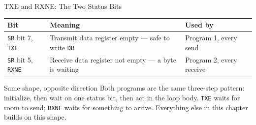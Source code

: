 \documentclass[9pt,aspectratio=169,xcolor=table]{beamer}
\newcommand{\striped}{\rowcolors{1}{white}{stripe}}
\begin{document}
\begin{frame}{TXE and RXNE: The Two Status Bits}
	\begin{center}
	\end{center}

	\vspace{5mm}

	\begin{center}
		{\small
			\striped
			\begin{tabular}{@{}l l R{.42\textwidth}@{}}
				\toprule
				\textbf{Bit} & \textbf{Meaning} & \textbf{Used by} \\
				\midrule
				\texttt{SR} bit 7, \texttt{TXE} &
				Transmit data register empty --- safe to write \texttt{DR} &
				Program 1, every send \\

				\texttt{SR} bit 5, \texttt{RXNE} &
				Receive data register not empty --- a byte is waiting &
				Program 2, every receive \\
				\bottomrule
			\end{tabular}
		}
	\end{center}

	\vspace{2mm}

	\begin{block}{Same shape, opposite direction}
		Both programs are the same three-step pattern: \alert{initialize}, then
		\alert{wait} on one status bit, then \alert{act} in the loop body.
		\texttt{TXE} waits for room to send; \texttt{RXNE} waits for something
		to arrive. Everything else in this chapter builds on this shape.
	\end{block}
\end{frame}
\end{document}
